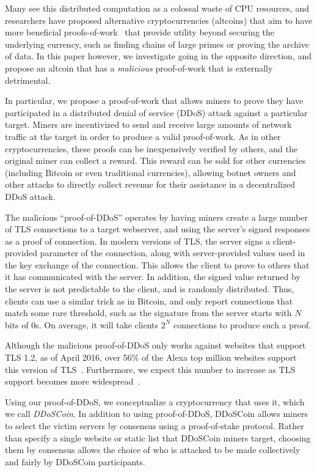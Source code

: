 Many see this distributed computation as a colossal waste of CPU resources, and
researchers have proposed alternative cryptocurrencies (altcoins) that aim to
have more beneficial proofs-of-work~\cite{primecoin,permacoin} that provide
utility beyond securing the underlying currency, such as finding chains of
large primes or proving the archive of data. In this paper however, we
investigate going in the opposite direction, and propose an altcoin that has a
\emph{malicious} proof-of-work that is externally detrimental.

In particular, we propose a proof-of-work that allows miners to prove they have
participated in a distributed denial of service (DDoS) attack against a
particular target. Miners are incentivized to send and receive large amounts of network
traffic at the target in order to produce a valid proof-of-work. As in other
cryptocurrencies, these proofs can be inexpensively verified by others, and the
original miner can collect a reward. This reward can be sold for other
currencies (including Bitcoin or even traditional currencies), allowing botnet
owners and other attacks to directly collect revenue for their assistance
in a decentralized DDoS attack.


The malicious ``proof-of-DDoS'' operates by having miners create a large number of
TLS connections to a target webserver, and using the server's signed responses
as a proof of connection. In modern versions of TLS, the server signs a
client-provided parameter of the connection, along with server-provided values
used in the key exchange of the connection. This allows the client to prove to
others that it has communicated with the server. In addition, the signed value
returned by the server is not predictable to the client, and is randomly
distributed. Thus, clients can use a similar trick as in Bitcoin, and only
report connections that match some rare threshold, such as the signature from
the server starts with $N$ bits of 0s. On average, it will take clients $2^{N}$
connections to produce such a proof.

Although the malicious proof-of-DDoS only works against websites that support
TLS 1.2, as of April 2016, over 56\% of the Alexa top million websites support
this version of TLS~\cite{censys}. Furthermore, we
expect this number to increase as TLS support becomes more
widespread~\cite{letsencrypt}.

Using our proof-of-DDoS, we conceptualize a cryptocurrency that uses it, which
we call \emph{DDoSCoin}. In addition to using proof-of-DDoS, DDoSCoin allows
miners to select the victim servers by consensus using a proof-of-stake
protocol. Rather than specify a single website or static list that DDoSCoin
miners target, choosing them by consensus allows the choice of who is attacked
to be made collectively and fairly by DDoSCoin participants.

